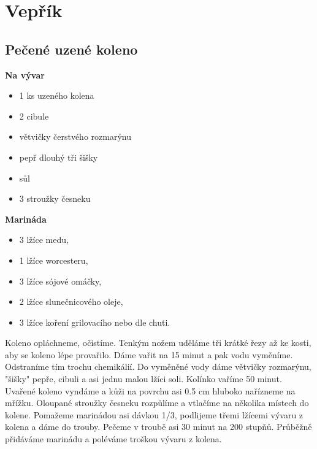 \documentclass[10pt,a4paper]{article}
\newenvironment{myitemize}
{ \begin{itemize}
    \setlength{\itemsep}{0pt}
    \setlength{\parskip}{0pt}
    \setlength{\parsep}{0pt}     }
{ \end{itemize}                  }
\begin{document}
\section{Vepřík}
\subsection{Pečené uzené koleno}
\begin{minipage}[t]{0,5\textwidth}
\textbf{Na vývar}
\begin{myitemize} 
\item 1 ks uzeného kolena
\item  2 cibule
\item  větvičky čerstvého  rozmarýnu
\item  pepř dlouhý tři šišky
\item  sůl
\item  3 stroužky česneku
\end{myitemize}
\textbf{Marináda}
\begin{myitemize} 
\item 3 lžíce  medu, 
\item 1 lžíce worcesteru, 
\item 3 lžíce sójové omáčky, 
\item 2 lžíce slunečnicového  oleje, 
\item 3 lžíce koření grilovacího nebo dle chuti.
\end{myitemize}
\end{minipage}
\begin{minipage}[t]{0,5\textwidth}

Koleno opláchneme, očistíme. Tenkým nožem uděláme tři krátké řezy až ke kosti, aby se koleno lépe provařilo. Dáme vařit na 15 minut a pak vodu vyměníme. Odstraníme tím trochu chemikálií. Do vyměněné vody dáme větvičky rozmarýnu, "šišky" pepře, cibuli a asi jednu malou lžíci soli. Kolínko vaříme 50 minut. Uvařené koleno vyndáme a kůži na povrchu asi 0.5 cm hluboko nařízneme na mřížku. Oloupané stroužky česneku rozpůlíme a vtlačíme na několika místech do kolene. Pomažeme marinádou asi dávkou 1/3, podlijeme třemi lžícemi vývaru z kolena a dáme do trouby. Pečeme v troubě asi 30 minut na 200 stupňů. Průběžně přidáváme marinádu a poléváme troškou vývaru z kolena.
\end{minipage}
\end{document}
